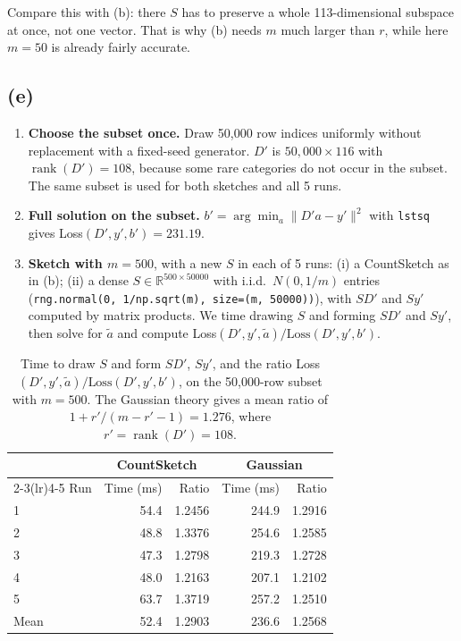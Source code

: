 Compare this with (b): there $S$ has to preserve a whole 113-dimensional subspace at once, not one vector.
That is why (b) needs $m$ much larger than $r$, while here $m = 50$ is already fairly accurate.

\subsection*{(e)}

\begin{enumerate}
    \item \textbf{Choose the subset once.} Draw 50{,}000 row indices uniformly without replacement with a
    fixed-seed generator. $D'$ is $50{,}000 \times 116$ with $\operatorname{rank}(D') = 108$, because some rare
    categories do not occur in the subset. The same subset is used for both sketches and all 5 runs.
    \item \textbf{Full solution on the subset.} $b' = \arg\min_a \|D'a-y'\|^2$ with \texttt{lstsq} gives
    Loss$(D',y',b') = 231.19$.
    \item \textbf{Sketch with $m = 500$}, with a new $S$ in each of 5 runs: (i) a CountSketch as in (b); (ii) a
    dense $S \in \mathbb{R}^{500\times 50000}$ with i.i.d.\ $N(0,1/m)$ entries
    (\texttt{rng.normal(0, 1/np.sqrt(m), size=(m, 50000))}), with $SD'$ and $Sy'$ computed by matrix products.
    We time drawing $S$ and forming $SD'$ and $Sy'$, then solve for $\tilde a$ and compute
    Loss$(D',y',\tilde a)/\text{Loss}(D',y',b')$.
\end{enumerate}

\begin{table}[H]
\centering
\begin{tabular}{lrrrr}
\toprule
 & \multicolumn{2}{c}{CountSketch} & \multicolumn{2}{c}{Gaussian} \\
\cmidrule(lr){2-3}\cmidrule(lr){4-5}
Run & Time (ms) & Ratio & Time (ms) & Ratio \\
\midrule
1 & 54.4 & 1.2456 & 244.9 & 1.2916 \\
2 & 48.8 & 1.3376 & 254.6 & 1.2585 \\
3 & 47.3 & 1.2798 & 219.3 & 1.2728 \\
4 & 48.0 & 1.2163 & 207.1 & 1.2102 \\
5 & 63.7 & 1.3719 & 257.2 & 1.2510 \\
\midrule
Mean & 52.4 & 1.2903 & 236.6 & 1.2568 \\
\bottomrule
\end{tabular}
\caption{Time to draw $S$ and form $SD'$, $Sy'$, and the ratio Loss$(D',y',\tilde a)/\text{Loss}(D',y',b')$,
on the 50{,}000-row subset with $m = 500$. The Gaussian theory gives a mean ratio of
$1 + r'/(m-r'-1) = 1.276$, where $r' = \operatorname{rank}(D') = 108$.}
\end{table}

